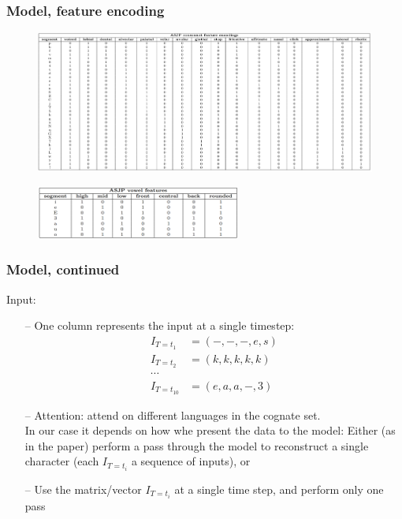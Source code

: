 \documentclass[11pt]{beamer}
\begin{document}
\begin{frame}
    \frametitle{Model, feature encoding}
    \begin{figure}
        \centering
        \includegraphics[scale=.21]{graphics/asjp_cons.png}
    \end{figure} 
    \begin{figure}[htp]
            \centering
            \includegraphics[width=0.6\textwidth ]{graphics/asjp_vowels.png}
    \end{figure}
 \end{frame}


\begin{frame}
    \frametitle{Model, continued}
    Input:
    \begin{itemize}
        \item[--] One column represents the input at a single timestep: 
        \begin{align*}
            I_{T=t_{1}} &= (-,-,-,e,s) \\
            I_{T=t_{2}} &= (k,k,k,k,k) \\
            \cdots \\
            I_{T=t_{10}} &= (e,a,a,-,3)
        \end{align*} 
        \item[--] Attention: \cite{meloni_ab_2019} attend on different languages in the cognate set. \\
        In our case it depends on how whe present the data to the model:
        Either (as in the paper) perform a pass through the model to reconstruct a single character (each $I_{T=t_{i}}$ a sequence of inputs), or 
        \item[--] Use the matrix/vector $I_{T=t_{i}}$ at a single time step, and perform only one pass
    \end{itemize}
\end{frame}
\end{document}
